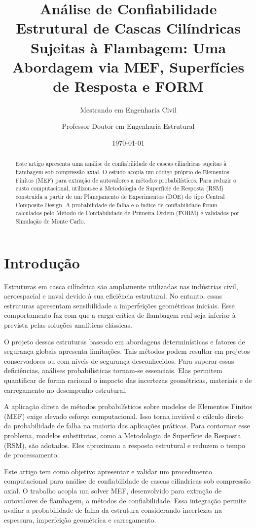 \documentclass[12pt,a4paper]{article}
\title{Análise de Confiabilidade Estrutural de Cascas Cilíndricas Sujeitas à Flambagem: Uma Abordagem via MEF, Superfícies de Resposta e FORM}
\author{Mestrando em Engenharia Civil \and Professor Doutor em Engenharia Estrutural}
\date{\today}
\begin{document}
\maketitle

\begin{abstract}
Este artigo apresenta uma análise de confiabilidade de cascas cilíndricas sujeitas à flambagem sob compressão axial. O estudo acopla um código próprio de Elementos Finitos (MEF) para extração de autovalores a métodos probabilísticos. Para reduzir o custo computacional, utilizou-se a Metodologia de Superfície de Resposta (RSM) construída a partir de um Planejamento de Experimentos (DOE) do tipo Central Composite Design. A probabilidade de falha e o índice de confiabilidade foram calculados pelo Método de Confiabilidade de Primeira Ordem (FORM) e validados por Simulação de Monte Carlo.
\end{abstract}

\section{Introdução}
Estruturas em casca cilíndrica são amplamente utilizadas nas indústrias civil, aeroespacial e naval devido à sua eficiência estrutural. No entanto, essas estruturas apresentam sensibilidade a imperfeições geométricas iniciais. Esse comportamento faz com que a carga crítica de flambagem real seja inferior à prevista pelas soluções analíticas clássicas.

O projeto dessas estruturas baseado em abordagens determinísticas e fatores de segurança globais apresenta limitações. Tais métodos podem resultar em projetos conservadores ou com níveis de segurança desconhecidos. Para superar essas deficiências, análises probabilísticas tornam-se essenciais. Elas permitem quantificar de forma racional o impacto das incertezas geométricas, materiais e de carregamento no desempenho estrutural.

A aplicação direta de métodos probabilísticos sobre modelos de Elementos Finitos (MEF) exige elevado esforço computacional. Isso torna inviável o cálculo direto da probabilidade de falha na maioria das aplicações práticas. Para contornar esse problema, modelos substitutos, como a Metodologia de Superfície de Resposta (RSM), são adotados. Eles aproximam a resposta estrutural e reduzem o tempo de processamento.

Este artigo tem como objetivo apresentar e validar um procedimento computacional para análise de confiabilidade de cascas cilíndricas sob compressão axial. O trabalho acopla um solver MEF, desenvolvido para extração de autovalores de flambagem, a métodos de confiabilidade. Essa integração permite avaliar a probabilidade de falha da estrutura considerando incertezas na espessura, imperfeição geométrica e carregamento.
\end{document}
